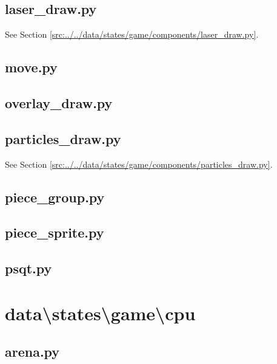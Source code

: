 \documentclass[../main/main.tex]{subfiles}
\begin{document}
\subsection{laser\_draw.py}
See Section \ref{src:../../data/states/game/components/laser_draw.py}.

\subsection{move.py}

\label{src:data/states/game/components/move.py}

\subsection{overlay\_draw.py}

\label{src:data/states/game/components/overlay_draw.py}

\subsection{particles\_draw.py}
See Section \ref{src:../../data/states/game/components/particles_draw.py}.

\subsection{piece\_group.py}

\label{src:data/states/game/components/piece_group.py}

\subsection{piece\_sprite.py}

\label{src:data/states/game/components/piece_sprite.py}

\subsection{psqt.py}

\label{src:data/states/game/components/psqt.py}

\section{data\textbackslash states\textbackslash game\textbackslash cpu}
\subsection{arena.py}

\label{src:data/states/game/cpu/arena.py}
\end{document}
